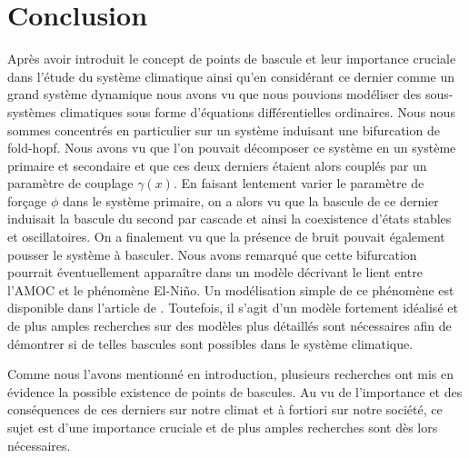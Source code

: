 \section{Conclusion}
Après avoir introduit le concept de points de bascule et leur importance cruciale dans l'étude du système climatique ainsi qu'en considérant ce dernier comme un grand système dynamique nous avons vu que nous pouvions modéliser des sous-systèmes climatiques sous forme d'équations différentielles ordinaires. Nous nous sommes concentrés en particulier sur un système induisant une bifurcation de fold-hopf. Nous avons vu que l'on pouvait décomposer ce système en un système primaire et secondaire et que ces deux derniers étaient alors couplés par un paramètre de couplage $\gamma(x)$. En faisant lentement varier le paramètre de forçage $\phi$ dans le système primaire, on a alors vu que la bascule de ce dernier induisait la bascule du second par cascade et ainsi la coexistence d'états stables et oscillatoires. On a finalement vu que la présence de bruit pouvait également pousser le système à basculer. Nous avons remarqué que cette bifurcation pourrait éventuellement apparaître dans un modèle décrivant le lient entre l'AMOC et le phénomène El-Niño. Un modélisation simple de ce phénomène est disponible dans l'article de \cite{dekker_cascading_2018}. Toutefois, il s'agit d'un modèle fortement idéalisé et de plus amples recherches sur des modèles plus détaillés sont nécessaires afin de démontrer si de telles bascules sont possibles dans le système climatique.

Comme nous l'avons mentionné en introduction, plusieurs recherches ont mis en évidence la possible existence de points de bascules. Au vu de l'importance et des conséquences de ces derniers sur notre climat et à fortiori sur notre société, ce sujet est d'une importance cruciale et de plus amples recherches sont dès lors nécessaires.


